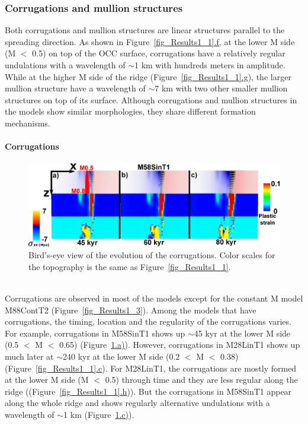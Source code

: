 \subsubsection{Corrugations and mullion structures}

Both corrugations and mullion structures are linear structures parallel to the spreading direction. As shown in Figure~\hyperref[fig_Results1_1]{\ref{fig_Results1_1}.f}, at the lower M side (M $<$ 0.5) on top of the OCC surface, corrugations have a relatively regular undulations with a wavelength of $\sim$1 km with hundreds meters in amplitude. While at the higher M side of the ridge (Figure~\hyperref[fig_Results1_1]{\ref{fig_Results1_1}.g}), the larger mullion structure have a wavelength of $\sim$7 km with two other smaller mullion structures on top of its surface. Although corrugations and mullion structures in the models show similar morphologies, they share different formation mechanisms.      

\paragraph{Corrugations}

\begin{figure}[h]
  \centering
    \includegraphics[width=1.0\textwidth]{./Figures/fig_Results_3_2_6_corrugations_evolution.eps}
  \caption{Bird's-eye view of the evolution of the corrugations. Color scales for the topography is the same as Figure~\hyperref[fig_Results1_1]{\ref{fig_Results1_1}}.}
 \label{fig_Results_3_2_6_corrugations_evolution}
\end{figure}

~\\
Corrugations are observed in most of the models except for the constant M model M88ContT2 (Figure~\hyperref[fig_Results1_3]{\ref{fig_Results1_3}}). Among the models that have corrugations, the timing, location and the regularity of the corrugations varies. For example, corrugations in M58SinT1 shows up $\sim$45 kyr at the lower M side (0.5 $<$ M $<$ 0.65) (Figure~\hyperref[fig_Results_3_2_6_corrugations_evolution]{\ref{fig_Results_3_2_6_corrugations_evolution}.a)}). However, corrugations in M28LinT1 shows up much later at $\sim$240 kyr at the lower M side (0.2 $<$ M $<$ 0.38) (Figure~\hyperref[fig_Results1_1]{\ref{fig_Results1_1}.c}). For M28LinT1, the corrugations are mostly formed at the lower M side (M $<$ 0.5) through time and they are less regular along the ridge ((Figure~\hyperref[fig_Results1_1]{\ref{fig_Results1_1}.h})). But the corrugations in M58SinT1 appear along the whole ridge and shows regularly alternative undulations with a wavelength of $\sim$1 km (Figure~\hyperref[fig_Results_3_2_6_corrugations_evolution]{\ref{fig_Results_3_2_6_corrugations_evolution}.c)}). 

